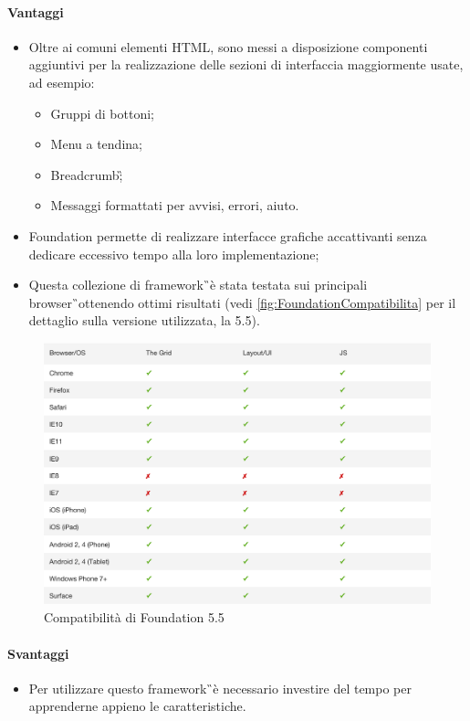 \paragraph{Vantaggi}
	\begin{itemize}
		\item Oltre ai comuni elementi HTML, sono messi a disposizione componenti aggiuntivi per la realizzazione delle sezioni di interfaccia maggiormente usate, ad esempio: 
		\begin{itemize}
			\item Gruppi di bottoni;
			\item Menu a tendina;
			\item \gls{Breadcrumb}\G;
			\item Messaggi formattati per avvisi, errori, aiuto.
		\end{itemize}\item Foundation permette di realizzare interfacce grafiche accattivanti senza dedicare eccessivo tempo alla loro implementazione;
		\item Questa collezione di \gls{framework}\G\ è stata testata sui principali \gls{browser}\G\ ottenendo ottimi risultati (vedi \autoref{fig:FoundationCompatibilita} per il dettaglio sulla versione utilizzata, la 5.5).
	\end{itemize}
	\begin{figure}[H]
		\begin{center}
			\includegraphics[width=15cm]{Pics/foundation5_compatibilita.png}
			\caption{Compatibilità di Foundation 5.5}
			\label{fig:FoundationCompatibilita}
		\end{center}
	\end{figure}
\paragraph{Svantaggi}
	\begin{itemize}
		\item Per utilizzare questo \gls{framework}\G\ è necessario investire del tempo per apprenderne appieno le caratteristiche.
	\end{itemize}
